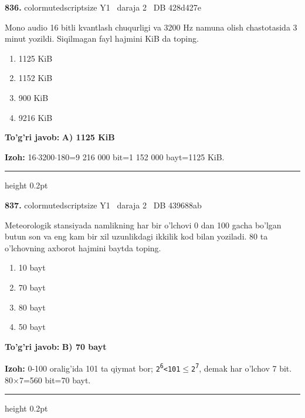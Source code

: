 \documentclass[10pt,a4paper,oneside]{article}
\begin{document}
\noindent\textbf{\color{ink}836.}  {color{muted}scriptsize Y1 \textbullet\ daraja 2 \textbullet\ DB 428d427e}
\par
Mono audio 16 bitli kvantlash chuqurligi va 3200 Hz namuna olish chastotasida 3 minut yozildi. Siqilmagan fayl hajmini KiB da toping.
\begin{enumerate}[label=\Alph*),leftmargin=9mm]
\item 1125 KiB
\item 1152 KiB
\item 900 KiB
\item 9216 KiB
\end{enumerate}
\begin{tcolorbox}[enhanced,breakable,colback=teal!4,colframe=teal!50!black,boxrule=0.5pt,arc=1.1mm,left=3mm,right=3mm,top=1.7mm,bottom=1.7mm,before skip=2mm,after skip=2mm]
\textbf{\color{teal}To'g'ri javob:} \textbf{A) 1125 KiB}
\par\smallskip
\textbf{Izoh:} 16\ensuremath{\cdot}3200\ensuremath{\cdot}180=9 216 000 bit=1 152 000 bayt=1125 KiB.
\end{tcolorbox}
\vspace{2mm}\hrule height 0.2pt \vspace{3mm}

\noindent\textbf{\color{ink}837.}  {color{muted}scriptsize Y1 \textbullet\ daraja 2 \textbullet\ DB 439688ab}
\par
Meteorologik stansiyada namlikning har bir o'lchovi 0 dan 100 gacha bo'lgan butun son va eng kam bir xil uzunlikdagi ikkilik kod bilan yoziladi. 80 ta o'lchovning axborot hajmini baytda toping.
\begin{enumerate}[label=\Alph*),leftmargin=9mm]
\item 10 bayt
\item 70 bayt
\item 80 bayt
\item 50 bayt
\end{enumerate}
\begin{tcolorbox}[enhanced,breakable,colback=teal!4,colframe=teal!50!black,boxrule=0.5pt,arc=1.1mm,left=3mm,right=3mm,top=1.7mm,bottom=1.7mm,before skip=2mm,after skip=2mm]
\textbf{\color{teal}To'g'ri javob:} \textbf{B) 70 bayt}
\par\smallskip
\textbf{Izoh:} 0-100 oralig'ida 101 ta qiymat bor; \texttt{2\textsuperscript{6}\textless{}101\ensuremath{\leq}2\textsuperscript{7}}, demak har o'lchov 7 bit. 80\ensuremath{\times}7=560 bit=70 bayt.
\end{tcolorbox}
\vspace{2mm}\hrule height 0.2pt \vspace{3mm}
\end{document}
